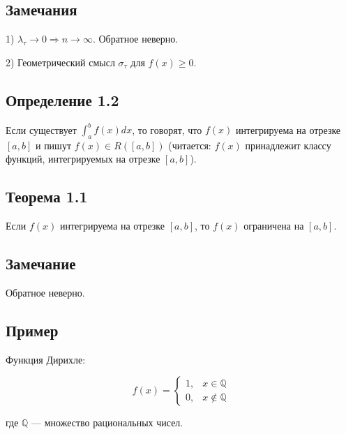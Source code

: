 {\subsection*{Замечания}

1) \( \lambda_\tau \to 0 \Rightarrow n \to \infty \). Обратное неверно.

2) Геометрический смысл \( \sigma_\tau \) для \( f(x) \geq 0 \).

\subsection*{Определение 1.2}

Если существует \( \int_a^b f(x)dx \), то говорят, что \( f(x) \) интегрируема на отрезке \( [a, b] \) и пишут \( f(x) \in R([a, b]) \) (читается: \( f(x) \) принадлежит классу функций, интегрируемых на отрезке \( [a, b] \)).

\subsection*{Теорема 1.1}

Если \( f(x) \) интегрируема на отрезке \( [a, b] \), то \( f(x) \) ограничена на \( [a, b] \).

\subsection*{Замечание}

Обратное неверно.

\subsection*{Пример}

Функция Дирихле:

\[
f(x) =
\begin{cases} 
1, & x \in \mathbb{Q} \\ 
0, & x \notin \mathbb{Q}
\end{cases}
\]

где \( \mathbb{Q} \) — множество рациональных чисел.
}